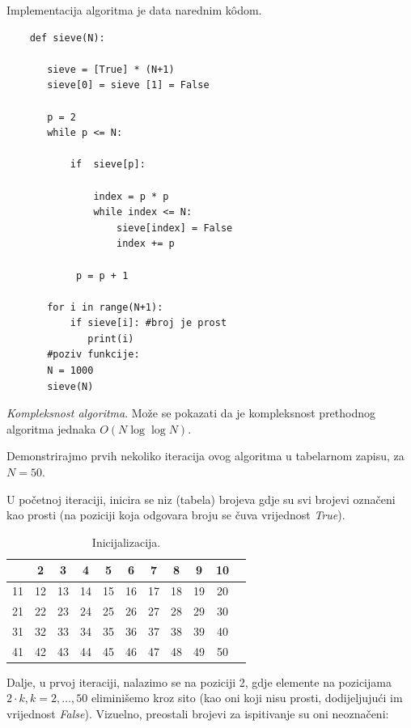 Implementacija algoritma je data narednim k\^odom. 

\begin{verbatim}
	def sieve(N):
	   
	   sieve = [True] * (N+1)
	   sieve[0] = sieve [1] = False
	   
	   p = 2
	   while p <= N:
	       
	       if  sieve[p]:
	        
	           index = p * p
	           while index <= N:
	               sieve[index] = False
	               index += p
	           
	        p = p + 1
	   
	   for i in range(N+1):
	       if sieve[i]: #broj je prost
	          print(i)
       #poziv funkcije:
       N = 1000
       sieve(N)
\end{verbatim}  
\textit{Kompleksnost algoritma}.  Može se pokazati da je kompleksnost prethodnog algoritma jednaka $O(N \log\log N )$. 


Demonstrirajmo   prvih nekoliko iteracija ovog algoritma u tabelarnom zapisu, za $N=50.$ 

U početnoj iteraciji, inicira se niz (tabela) brojeva gdje su svi brojevi označeni kao prosti (na poziciji koja odgovara broju se čuva vrijednost \emph{True}).


\begin{table}[H]
	\centering
	\begin{tabular}{|c|c|c|c|c|c|c|c|c|c|c} \hline
       & 2 & 3 & 4 & 5 & 6 & 7 & 8 & 9 & 10 \\ \hline
    11 & 12 & 13 & 14 & 15 & 16 & 17 & 18 & 19 & 20 \\ \hline
    21 & 22 & 23 & 24 & 25 & 26 & 27 & 28 & 29 & 30 \\ \hline
    31 & 32 & 33 & 34 & 35 & 36 & 37 & 38 & 39 & 40 \\ \hline
    41 & 42 & 43 & 44 & 45 & 46 & 47 & 48 & 49 & 50 \\ \hline     
	\end{tabular}
    \caption{Inicijalizacija.} \label{eratosten-sieve-it-0}
\end{table}


Dalje, u prvoj iteraciji, nalazimo se na poziciji 2, gdje elemente na pozicijama $2 \cdot k, k=2, \ldots, 50$ eliminišemo kroz sito (kao oni koji nisu prosti, dodijeljujući im vrijednost \emph{False}). Vizuelno, preostali brojevi za ispitivanje su oni neoznačeni:



